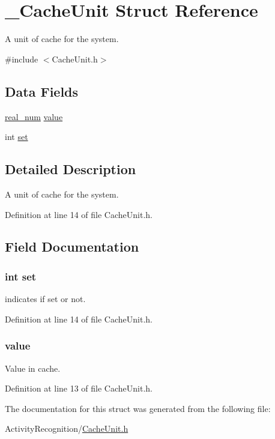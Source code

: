 \hypertarget{struct___cache_unit}{
\section{\_\-CacheUnit Struct Reference}
\label{struct___cache_unit}
}


A unit of cache for the system.  




{\ttfamily \#include $<$CacheUnit.h$>$}

\subsection*{Data Fields}
\begin{DoxyCompactItemize}
\item 
\hyperlink{_constants_8h_afc78ec715915283bee8ffa1ecc5c3f4d}{real\_\-num} \hyperlink{struct___cache_unit_af4d7b94172b2f3f3af08300e96cc3e89}{value}
\item 
int \hyperlink{struct___cache_unit_abc95fb2bad5b94ceca590f7dacd269b5}{set}
\end{DoxyCompactItemize}


\subsection{Detailed Description}
A unit of cache for the system. 

Definition at line 14 of file CacheUnit.h.



\subsection{Field Documentation}
\hypertarget{struct___cache_unit_abc95fb2bad5b94ceca590f7dacd269b5}{
\subsubsection[{set}]{\setlength{\rightskip}{0pt plus 5cm}int {\bf set}}}
\label{struct___cache_unit_abc95fb2bad5b94ceca590f7dacd269b5}
indicates if set or not. 

Definition at line 14 of file CacheUnit.h.

\hypertarget{struct___cache_unit_af4d7b94172b2f3f3af08300e96cc3e89}{
\subsubsection[{value}]{ {\bf value}}}
\label{struct___cache_unit_af4d7b94172b2f3f3af08300e96cc3e89}
Value in cache. 

Definition at line 13 of file CacheUnit.h.



The documentation for this struct was generated from the following file:\begin{DoxyCompactItemize}
\item 
ActivityRecognition/\hyperlink{_cache_unit_8h}{CacheUnit.h}\end{DoxyCompactItemize}
